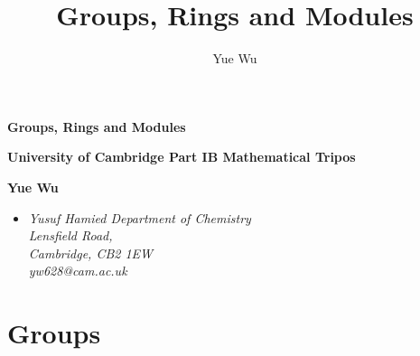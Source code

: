 \documentclass{article}
\title{Groups, Rings and Modules}
\author{Yue Wu}
\theoremstyle{plain}\theoremheaderfont{\normalfont\itshape}\theorembodyfont{\rmfamily}\theoremseparator{.}\newtheorem*{rem}{Remark}\newtheorem*{ex}{Example}\newtheorem*{proof}{Proof}\newtheorem*{altp}{Alternative proof}\newtheorem*{nonex}{Non-Example}
\theoremstyle{plain}\theoremheaderfont{\normalfont\bfseries}\theorembodyfont{\rmfamily}\theoremseparator{.}\newtheorem{thm}{Theorem}[section]\newtheorem{lem}[thm]{Lemma}\newtheorem{prop}[thm]{Proposition}\newtheorem*{cor}{Corollary}\newtheorem{defn}[thm]{Definition}\newtheorem{clm}[thm]{Claim}\newtheorem{clminproof}{Claim}\newtheorem*{notn}{Notation}\newtheorem*{exer}{Exercise}\newtheorem*{lemnn}{Lemma}
\theoremstyle{break}\theoremheaderfont{\normalfont\itshape}\theorembodyfont{\rmfamily}\theoremseparator{.\medskip}\newtheorem*{proofskip}{Proof}\newtheorem*{exs}{Examples}\newtheorem*{rems}{Remarks}\newtheorem*{obs}{Observations}
\theoremstyle{break}\theoremheaderfont{\normalfont\bfseries}\theorembodyfont{\rmfamily}\theoremseparator{.\medskip}\newtheorem{lemskip}[thm]{Lemma}\newtheorem{defnskip}[thm]{Definition}\newtheorem{propskip}[thm]{Proposition}\newtheorem{thmskip}[thm]{Theorem}
\numberwithin{equation}{section}
\begin{document}
    \setlength{\parindent}{0pt}
	\Huge\textsf{\textbf{Groups, Rings and Modules}}
		
	\Large\textsf{\textbf{University of Cambridge Part IB Mathematical Tripos}}

	\noindent\makebox[\linewidth]{\rule{\textwidth}{2pt}}

	\large\textsf{\textbf{Yue Wu}}
	\begin{itemize}[topsep=0pt,leftmargin=15pt]
		\item[] \textit{Yusuf Hamied Department of Chemistry\\
		Lensfield Road,\\
		Cambridge, CB2 1EW}\\

		\textit{yw628@cam.ac.uk}
	\end{itemize}
    \thispagestyle{empty}
    \setlength{\parindent}{15pt}
	
    \normalsize
    \newpage
	\tableofcontents
	\newpage

    \section{Groups}
\end{document}
